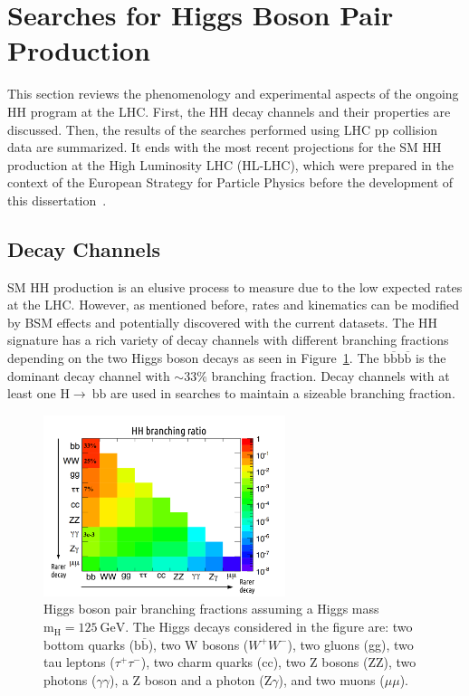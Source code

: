 \clearpage

\section{Searches for Higgs Boson Pair Production}
This section reviews the phenomenology and experimental aspects of the ongoing HH program at the LHC. First, the HH decay channels and their properties are discussed. Then, the results of the searches performed using LHC pp collision data are summarized. It ends with the most recent projections for the SM HH production at the High Luminosity LHC (HL-LHC), which were prepared in the context of the European Strategy for Particle Physics before the development of this dissertation~\cite{deBlas:2019rxi}.

\subsection{Decay Channels}
SM HH production is an elusive process to measure due to the low expected rates at the LHC. However, as mentioned before, rates and kinematics can be modified by BSM effects and potentially discovered with the current datasets. The HH signature has a rich variety of decay channels with different branching fractions depending on the two Higgs boson decays as seen in Figure~\ref{fig:hhbr}. The $\mathrm{b\overline{b}b\overline{b}}$ is the dominant decay channel with $\sim33\%$ branching fraction. Decay channels with at least one $\mathrm{H\rightarrow~bb}$ are used in searches to maintain a sizeable branching fraction.

\begin{figure}[ht!]
\centering
\includegraphics[width=0.63\textwidth]{Figures/HiggsPairProduction/brhh.pdf}
\caption[Higgs boson pair branching fractions assuming a Higgs mass $\mathrm{m_{H}=125~GeV}$]{Higgs boson pair branching fractions assuming a Higgs mass $\mathrm{m_{H}=125~GeV}$. The Higgs decays considered in the figure are: two bottom quarks ($\mathrm{b\overline{b}}$), two W bosons ($W^{+}W^{-}$), two gluons (gg), two tau leptons ($\tau^{+}\tau^{-}$), two charm quarks (cc), two Z bosons (ZZ), two photons ($\gamma\gamma$), a Z boson and a photon (Z$\gamma$), and two muons ($\mu\mu$).}
\label{fig:hhbr}
\end{figure}

